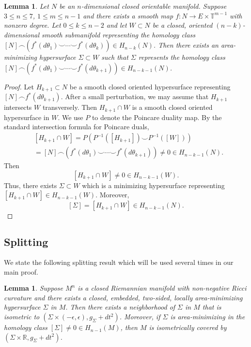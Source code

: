 \documentclass[11pt]{amsart}
\newtheorem{lemma}[theorem]{Lemma}
\theoremstyle{definition}
\theoremstyle{remark}
\numberwithin{equation}{section}
\begin{document}
\begin{lemma}\label{topology inherit}
    Let $N$ be an $n$-dimensional closed orientable manifold. Suppose $3\leq n\leq 7$, $1\leq m\leq n-1$ and there exists a smooth map $f:N\rightarrow E\times
      \mathbb{T}^{m-1}$ with nonzero degree. 
      Let $0\leq k\leq n-2$ and let $W\subset N$ be a closed, oriented
      $(n-k)$-dimensional smooth submanifold representing the homology class
      $[N]\frown(f^{*}(d\theta_{1})\smile \cdots\smile f^{*}(d\theta_{k}))\in
      H_{n-k}(N)$. Then there exists an area-minimizing hypersurface
      $\Sigma\subset W$ such that $\Sigma$ represents the homology class
      $[N]\frown(f^{*}(d\theta_{1})\smile \cdots\smile f^{*}(d\theta_{k+1}))\in H_{n-k-1}(N)$.
\end{lemma}
\begin{proof}
    Let $H_{k+1}\subset N$ be a smooth closed oriented hypersurface representing
      $[N]\frown f^{*}(d\theta_{k+1})$. After a small perturbation, we may assume that
      $H_{k+1}$ intersects $W$ transversely. Then $H_{k+1}\cap W$ is a smooth closed oriented
      hypersurface in $W$. We use $P$ to denote the Poincare duality map. By the standard
      intersection formula for Poincare duals,
    \[
    \begin{aligned}
    &[H_{k+1}\cap W] = P(P^{-1}([H_{k+1}])\smile P^{-1}([W]))\\
    &= [N]\frown(f^{*}(d\theta_{1})\smile \cdots\smile f^{*}(d\theta_{k+1}))\neq 0\in H_{n-k-1}(N).
    \end{aligned}
    \]
    Then
    \[
    [H_{k+1}\cap W]\neq 0 \in H_{n-k-1}(W).
    \]
    Thus, there exists $\Sigma\subset W$ which is a minimizing hypersurface representing $[H_{k+1}\cap W]\in H_{n-k-1}(W)$. Moreover,
    \[
    [\Sigma]= [H_{k+1}\cap W]\in H_{n-k-1}(N).
    \]
\end{proof}
\subsection{Splitting}
We state the following splitting result which will be used several times in our main proof.
\begin{lemma}\label{splitting-under-ric}
    Suppose $M^{n}$ is a closed Riemannian manifold with non-negative Ricci curvature and
      there exists a closed, embedded, two-sided, locally area-minimizing hypersurface $\Sigma$ in
      $M$.
    Then there exists a neighborhood of $\Sigma$ in $M$ that is isometric to $(\Sigma\times
      (-\epsilon,\epsilon),g_{\Sigma}+dt^2)$. Moreover, if $\Sigma$ is area-minimizing in the
      homology class $[\Sigma]\neq 0\in H_{n-1}(M)$, then $M$ is isometrically covered by
      $(\Sigma\times \mathbb{R},g_{\Sigma}+dt^2)$.  
\end{lemma}
\end{document}
